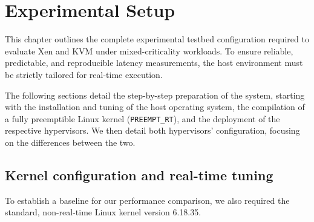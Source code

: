 \section{Experimental Setup}
\label{sec:setup}

This chapter outlines the complete experimental testbed configuration
required to evaluate Xen and KVM under mixed-criticality workloads. To
ensure reliable, predictable, and reproducible latency measurements, the
host environment must be strictly tailored for real-time execution.

The following sections detail the step-by-step preparation of the
system, starting with the installation and tuning of the host operating
system, the compilation of a fully preemptible Linux kernel
(\texttt{PREEMPT\_RT}), and the deployment of the respective
hypervisors. We then detail both hypervisors' configuration, focusing on
the differences between the two.

\subsection{Kernel configuration and real-time
tuning}\label{kernel-configuration-and-real-time-tuning}

To establish a baseline for our performance comparison, we also required
the standard, non-real-time Linux kernel version 6.18.35.

